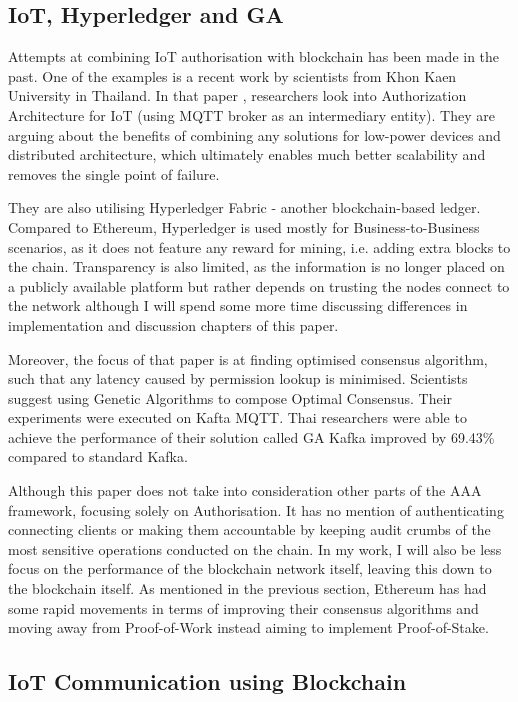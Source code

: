 \subsection{IoT, Hyperledger and GA}
Attempts at combining IoT authorisation with blockchain has been made in the past. One of the examples is a recent work by scientists from Khon Kaen University in Thailand. In that paper \cite{klaokliang2018novel}, researchers look into Authorization Architecture for IoT (using MQTT broker as an intermediary entity). They are arguing about the benefits of combining any solutions for low-power devices and distributed architecture, which ultimately enables much better scalability and removes the single point of failure.

They are also utilising Hyperledger Fabric - another blockchain-based ledger. Compared to Ethereum, Hyperledger \cite{cachin2016architecture} is used mostly for Business-to-Business scenarios, as it does not feature any reward for mining, i.e. adding extra blocks to the chain. Transparency is also limited, as the information is no longer placed on a publicly available platform but rather depends on trusting the nodes connect to the network although I will spend some more time discussing differences in implementation and discussion chapters of this paper.

Moreover, the focus of that paper is at finding optimised consensus algorithm, such that any latency caused by permission lookup is minimised. Scientists suggest using Genetic Algorithms to compose Optimal Consensus. Their experiments were executed on Kafta MQTT\cite{waehner_2019}. Thai researchers were able to achieve the performance of their solution called GA Kafka improved by 69.43\% compared to standard Kafka.

Although this paper does not take into consideration other parts of the AAA framework, focusing solely on Authorisation. It has no mention of authenticating connecting clients or making them accountable by keeping audit crumbs of the most sensitive operations conducted on the chain. In my work, I will also be less focus on the performance of the blockchain network itself, leaving this down to the blockchain itself. As mentioned in the previous section, Ethereum has had some rapid movements in terms of improving their consensus algorithms and moving away from Proof-of-Work instead aiming to implement Proof-of-Stake.

\subsection{IoT Communication using Blockchain}

